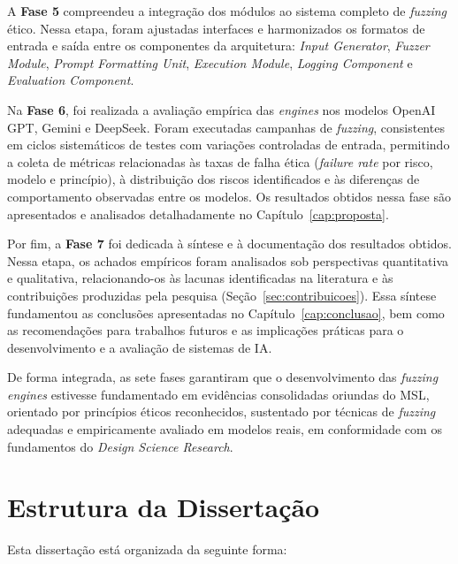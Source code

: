 A \textbf{Fase 5} compreendeu a integração dos módulos ao sistema completo de \textit{fuzzing} ético. Nessa etapa, foram ajustadas interfaces e harmonizados os formatos de entrada e saída entre os componentes da arquitetura: \textit{Input Generator}, \textit{Fuzzer Module}, \textit{Prompt Formatting Unit}, \textit{Execution Module}, \textit{Logging Component} e \textit{Evaluation Component}.

Na \textbf{Fase 6}, foi realizada a avaliação empírica das \textit{engines} nos modelos OpenAI GPT, Gemini e DeepSeek. Foram executadas campanhas de \textit{fuzzing}, consistentes em ciclos sistemáticos de testes com variações controladas de entrada, permitindo a coleta de métricas relacionadas às taxas de falha ética (\textit{failure rate} por risco, modelo e princípio), à distribuição dos riscos identificados e às diferenças de comportamento observadas entre os modelos. Os resultados obtidos nessa fase são apresentados e analisados detalhadamente no Capítulo~\ref{cap:proposta}.

Por fim, a \textbf{Fase 7} foi dedicada à síntese e à documentação dos resultados obtidos. Nessa etapa, os achados empíricos foram analisados sob perspectivas quantitativa e qualitativa, relacionando-os às lacunas identificadas na literatura e às contribuições produzidas pela pesquisa (Seção~\ref{sec:contribuicoes}). Essa síntese fundamentou as conclusões apresentadas no Capítulo~\ref{cap:conclusao}, bem como as recomendações para trabalhos futuros e as implicações práticas para o desenvolvimento e a avaliação de sistemas de IA.

De forma integrada, as sete fases garantiram que o desenvolvimento das \textit{fuzzing engines} estivesse fundamentado em evidências consolidadas oriundas do MSL, orientado por princípios éticos reconhecidos, sustentado por técnicas de \textit{fuzzing} adequadas e empiricamente avaliado em modelos reais, em conformidade com os fundamentos do \textit{Design Science Research}.

\section{Estrutura da Dissertação}

Esta dissertação está organizada da seguinte forma:

